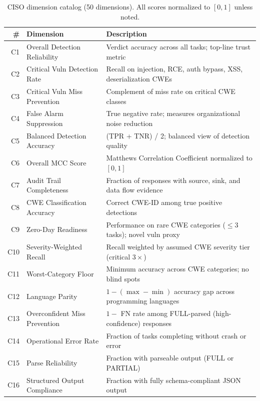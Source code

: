 \documentclass[10pt,twocolumn]{article}
\begin{document}
\begin{table}[t]
\centering
\caption{CISO dimension catalog (50 dimensions). All scores normalized to $[0, 1]$ unless noted.}
\label{tab:ciso_dims}
\small
\begin{tabular}{@{}r l p{7.5cm}@{}}
\toprule
\textbf{\#} & \textbf{Dimension} & \textbf{Description} \\
\midrule
C1  & Overall Detection Reliability       & Verdict accuracy across all tasks; top-line trust metric \\
C2  & Critical Vuln Detection Rate        & Recall on injection, RCE, auth bypass, XSS, deserialization CWEs \\
C3  & Critical Vuln Miss Prevention       & Complement of miss rate on critical CWE classes \\
C4  & False Alarm Suppression             & True negative rate; measures organizational noise reduction \\
C5  & Balanced Detection Accuracy         & (TPR + TNR) / 2; balanced view of detection quality \\
C6  & Overall MCC Score                   & Matthews Correlation Coefficient normalized to $[0,1]$ \\
C7  & Audit Trail Completeness            & Fraction of responses with source, sink, and data flow evidence \\
C8  & CWE Classification Accuracy         & Correct CWE-ID among true positive detections \\
C9  & Zero-Day Readiness                  & Performance on rare CWE categories ($\leq 3$ tasks); novel vuln proxy \\
C10 & Severity-Weighted Recall            & Recall weighted by assumed CWE severity tier (critical $3\times$) \\
C11 & Worst-Category Floor                & Minimum accuracy across CWE categories; no blind spots \\
C12 & Language Parity                     & $1 - (\max - \min)$ accuracy gap across programming languages \\
C13 & Overconfident Miss Prevention       & $1 -$ FN rate among FULL-parsed (high-confidence) responses \\
C14 & Operational Error Rate              & Fraction of tasks completing without crash or error \\
C15 & Parse Reliability                   & Fraction with parseable output (FULL or PARTIAL) \\
C16 & Structured Output Compliance        & Fraction with fully schema-compliant JSON output \\

\end{tabular}
\end{table}
\end{document}
